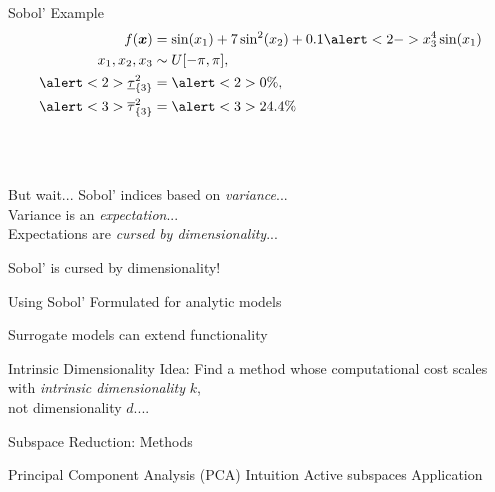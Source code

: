 \documentclass[14pt]{beamer}
\begin{document}
\begin{frame}{Sobol' Example}
  \begin{equation*} \begin{aligned}
    f(\vx) &= \sin(x_1) + 7\sin^2(x_2) + 0.1 \alert<2->{x_3^4\sin(x_1)} \\
    x_1, x_2, x_3 &\sim U[-\pi, \pi], \\
    \alert<2>{\underline{\tau}_{\{3\}}^2} &= \alert<2>{0\%}, \\
    \alert<3>{\overline{\tau}_{\{3\}}^2} &= \alert<3>{24.4\%}
  \end{aligned} \end{equation*}

  \\
  \\
\end{frame}

\begin{frame}{But wait...}
  Sobol' indices based on \emph{variance}... \\
  Variance is an \emph{expectation}... \\
  Expectations are \emph{cursed by dimensionality}...

  \bigskip Sobol' is cursed by dimensionality! \\
\end{frame}

\begin{frame}{Using Sobol'}
  Formulated for analytic models

  \bigskip Surrogate models can extend functionality
\end{frame}

\begin{frame}{Intrinsic Dimensionality}
  Idea: Find a method whose computational cost scales with \emph{intrinsic
    dimensionality} $k$,\\ \alert{not} dimensionality $d$....
\end{frame}

\begin{frame}{Subspace Reduction: Methods}
  \begin{outline}
    \1 Principal Component Analysis (PCA)
      \2 Intuition
    \1 Active subspaces
      \2 Application
  \end{outline}
\end{frame}
\end{document}
